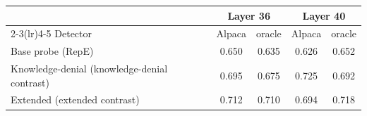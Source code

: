 \begin{tabular}{@{}l cccc@{}}
\toprule
 & \multicolumn{2}{c}{Layer 36} & \multicolumn{2}{c}{Layer 40} \\
\cmidrule(lr){2-3}\cmidrule(lr){4-5}
Detector & Alpaca & oracle & Alpaca & oracle \\
\midrule
Base probe (RepE) & 0.650 & 0.635 & 0.626 & 0.652 \\
Knowledge-denial (knowledge-denial contrast) & 0.695 & 0.675 & 0.725 & 0.692 \\
Extended (extended contrast) & 0.712 & 0.710 & 0.694 & 0.718 \\
\bottomrule
\end{tabular}
